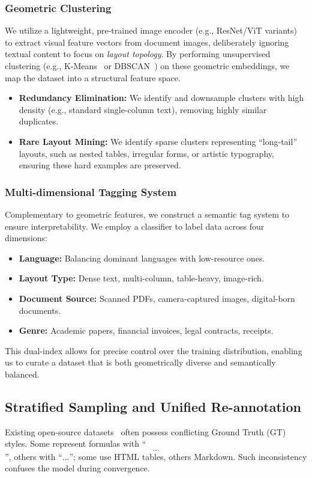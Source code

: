 \subsubsection{Geometric Clustering}
We utilize a lightweight, pre-trained image encoder (e.g., ResNet/ViT variants)~\cite{radford2021learning,chuang2025meta} to extract visual feature vectors from document images, deliberately ignoring textual content to focus on \textit{layout topology}. By performing unsupervised clustering (e.g., K-Means~\cite{ahmed2020k} or DBSCAN~\cite{hahsler2019dbscan}) on these geometric embeddings, we map the dataset into a structural feature space.
\begin{itemize}
    \item \textbf{Redundancy Elimination:} We identify and downsample clusters with high density (e.g., standard single-column text), removing highly similar duplicates.
    \item \textbf{Rare Layout Mining:} We identify sparse clusters representing ``long-tail'' layouts, such as nested tables, irregular forms, or artistic typography, ensuring these hard examples are preserved.
\end{itemize}

\subsubsection{Multi-dimensional Tagging System}
Complementary to geometric features, we construct a semantic tag system to ensure interpretability. We employ a classifier to label data across four dimensions:
\begin{itemize}
    \item \textbf{Language:} Balancing dominant languages with low-resource ones.
    \item \textbf{Layout Type:} Dense text, multi-column, table-heavy, image-rich.
    \item \textbf{Document Source:} Scanned PDFs, camera-captured images, digital-born documents.
    \item \textbf{Genre:} Academic papers, financial invoices, legal contracts, receipts.
\end{itemize}
This dual-index allows for precise control over the training distribution, enabling us to curate a dataset that is both geometrically diverse and semantically balanced.

\subsection{Stratified Sampling and Unified Re-annotation}
Existing open-source datasets~\cite{singh2021textocr,olmocrbench} often possess conflicting Ground Truth (GT) styles. Some represent formulas with ``$$...$$'', others with ``\(...\)''; some use HTML tables, others Markdown. Such inconsistency confuses the model during convergence.


